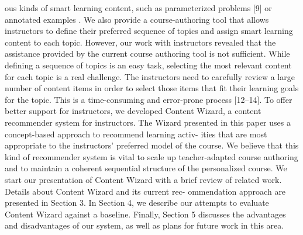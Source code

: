 \documentclass{sig-alternate}
\begin{document}
ous kinds of smart learning content, such as parameterized problems
[9] or annotated examples \cite{third}. We also provide a course-authoring
tool that allows instructors to define their preferred sequence of
topics and assign smart learning content to each topic. However,
our work with instructors revealed that the assistance provided by
the current course authoring tool is not sufficient. While defining
a sequence of topics is an easy task, selecting the most relevant
content for each topic is a real challenge. The instructors need
to carefully review a large number of content items in order to
select those items that fit their learning goals for the topic. This is
a time-consuming and error-prone process [12–14]. To offer better
support for instructors, we developed Content Wizard, a content
recommender system for instructors. The Wizard presented in this
paper uses a concept-based approach to recommend learning activ-
ities that are most appropriate to the instructors’ preferred model
of the course. We believe that this kind of recommender system is
vital to scale up teacher-adapted course authoring and to maintain
a coherent sequential structure of the personalized course.
We start our presentation of Content Wizard with a brief review
of related work. Details about Content Wizard and its current rec-
ommendation approach are presented in Section 3. In Section 4, we
describe our attempts to evaluate Content Wizard against a baseline.
Finally, Section 5 discusses the advantages and disadvantages of
our system, as well as plans for future work in this area.
\end{document}
